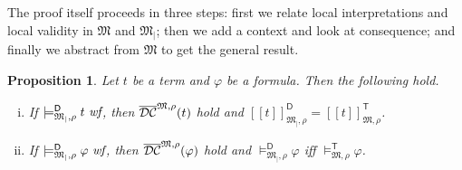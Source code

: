 \documentclass{article}
\newtheorem{proposition}[definition]{Proposition}
\newcommand{\restrfunm}[1]{\ensuremath{\mathfrak{#1}_|}}
\newcommand{\restrfun}[1]{\ensuremath{{#1}_|}}
\newcommand{\wf}{\ \mbox{\em wf}}
\newcommand{\ints}[4]{\ensuremath{[\![{#4}]\!]^{\mathsf{#1}}_{\mathfrak{#2},{#3}}}}
\newcommand{\mymodelss}[3]{\ensuremath{\models_{\mathfrak{#2},{#3}}^{\mathsf{#1}}}}
\newcommand{\semDC}[2][{\mathfrak M},\rho]{\ensuremath{\overline{\cal{DC}}^{#1}_{#2}}}
\begin{document}
\bigskip\noindent
The proof itself proceeds in three steps: first we relate local
interpretations and local validity in $\mathfrak M$ and $\restrfunm M$;
then we add a context and look at consequence; and finally we abstract
from $\mathfrak M$ to get the general result.
\begin{proposition}\label{DintTint}
Let $t$ be a term and $\varphi$ be a formula.  Then the following hold.
\begin{enumerate}[(i)]
\item If $\mymodelss{D}{\restrfun M}\rho t\wf$, then $\semDC{}(t)$
hold and $\ints{D}{\restrfun M}\rho t=\ints{T}{M}\rho t$.
\item If $\mymodelss{D}{\restrfun M}\rho\varphi\wf$, then
$\semDC{}(\varphi)$ hold and $\mymodelss{D}{\restrfun M}\rho\varphi$
iff $\mymodelss{T}{M}\rho\varphi$.
\end{enumerate}
\end{proposition}
\end{document}
